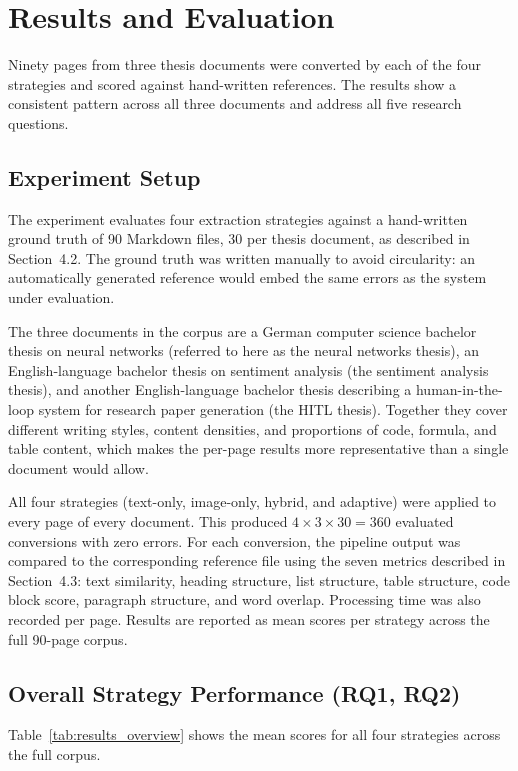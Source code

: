 \chapter{Results and Evaluation}

Ninety pages from three thesis documents were converted by each of the four
strategies and scored against hand-written references. The results show a
consistent pattern across all three documents and address all five research
questions.

\section{Experiment Setup}

The experiment evaluates four extraction strategies against a
hand-written ground truth of 90 Markdown files, 30 per thesis document,
as described in Section~4.2. The ground truth was written manually to
avoid circularity: an automatically generated reference would embed the
same errors as the system under evaluation.

The three documents in the corpus are a German computer science
bachelor thesis on neural networks (referred to here as the neural
networks thesis), an English-language bachelor thesis on sentiment analysis
(the sentiment analysis thesis), and another English-language bachelor
thesis describing a human-in-the-loop system for research paper
generation (the HITL thesis). Together they cover different writing
styles, content densities, and proportions of code, formula, and
table content, which makes the per-page results more representative
than a single document would allow.

All four strategies (text-only, image-only, hybrid, and adaptive) were
applied to every page of every document. This produced
$4 \times 3 \times 30 = 360$ evaluated conversions with zero errors.
For each conversion, the pipeline output was compared to the
corresponding reference file using the seven metrics described in
Section~4.3: text similarity, heading structure, list structure,
table structure, code block score, paragraph structure, and word
overlap. Processing time was also recorded per page.
Results are reported as mean scores per strategy across the full
90-page corpus.

\section{Overall Strategy Performance (RQ1, RQ2)}

Table~\ref{tab:results_overview} shows the mean scores for all four
strategies across the full corpus.

